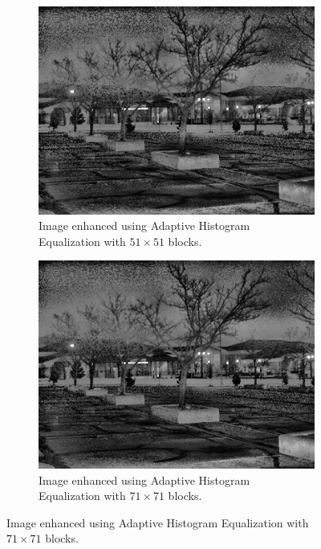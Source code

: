 \documentclass[a4paper, landscape]{article}
\begin{document}
\begin{figure}
    \centering
    \begin{subfigure}{0.32\linewidth}
        \centering
        \includegraphics[width=\linewidth]{big_enhanced_LC1.png}
        \caption{Image enhanced using Adaptive Histogram Equalization with $51\times 51$ blocks.}
    \end{subfigure}
    \begin{subfigure}{0.32\linewidth}
        \centering
        \includegraphics[width=\linewidth]{chonky_enhanced_LC1.png}
        \caption{Image enhanced using Adaptive Histogram Equalization with $71\times 71$ blocks.}
        \label{lc1_71_ahe}
    \end{subfigure}

\end{figure}
\end{document}
